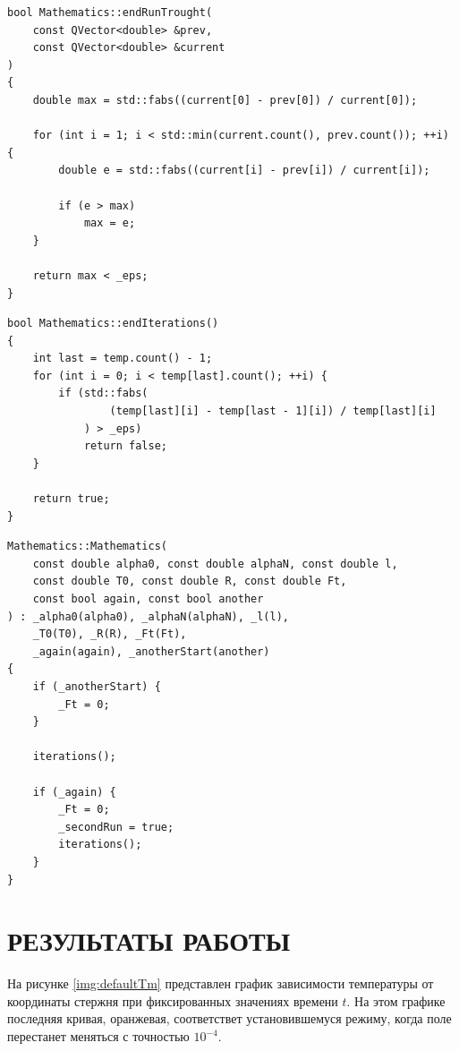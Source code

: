 \begin{lstlisting}[caption=Условие завершения прогонки]
bool Mathematics::endRunTrought(
    const QVector<double> &prev,
    const QVector<double> &current
)
{
    double max = std::fabs((current[0] - prev[0]) / current[0]);

    for (int i = 1; i < std::min(current.count(), prev.count()); ++i) {
        double e = std::fabs((current[i] - prev[i]) / current[i]);

        if (e > max)
            max = e;
    }

    return max < _eps;
}
\end{lstlisting}

\begin{lstlisting}[caption=Условие завершения метода простых итераций]
bool Mathematics::endIterations()
{
    int last = temp.count() - 1;
    for (int i = 0; i < temp[last].count(); ++i) {
        if (std::fabs(
                (temp[last][i] - temp[last - 1][i]) / temp[last][i]
            ) > _eps)
            return false;
    }

    return true;
}
\end{lstlisting}

\begin{lstlisting}[caption=Запуск вычислений]
Mathematics::Mathematics(
    const double alpha0, const double alphaN, const double l,
    const double T0, const double R, const double Ft,
    const bool again, const bool another
) : _alpha0(alpha0), _alphaN(alphaN), _l(l),
    _T0(T0), _R(R), _Ft(Ft),
    _again(again), _anotherStart(another)
{
    if (_anotherStart) {
        _Ft = 0;
    }

    iterations();

    if (_again) {
        _Ft = 0;
        _secondRun = true;
        iterations();
    }
}
\end{lstlisting}

\section{РЕЗУЛЬТАТЫ РАБОТЫ}

На рисунке \ref{img:defaultTm} представлен график зависимости температуры от координаты стержня при фиксированных значениях времени $t$. На этом графике последняя кривая, оранжевая, соответствет установившемуся режиму, когда поле перестанет меняться с точностью $10^{-4}$.

